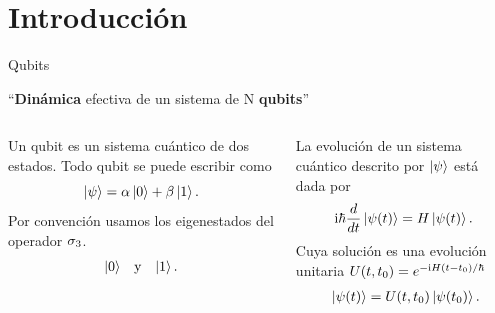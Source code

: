 \section{Introducción}


\begin{frame}{Qubits}
    \begin{center}
        ``\textbf{Dinámica} efectiva de un sistema de N \textbf{qubits}''
    \end{center}
    \pause
    \begin{columns}
        \begin{column}{0.5\textwidth}
            \begin{center}
                Un qubit es un sistema cuántico de dos estados.
                \pause
                Todo qubit se puede escribir como
                \begin{equation}
                    \ket{\psi}=\alpha\ket{0}+\beta\ket{1}.\nonumber
                \end{equation}
                \pause
                Por convención usamos los eigenestados del operador $\sigma_{3}$.
                \begin{align}
                    \ket{0} & & \text{y} & & \ket{1}. \nonumber
                \end{align} 
            \end{center}
        \end{column}
        \pause
        \begin{column}{0.5\textwidth}
            La evolución de un sistema cuántico descrito por $\ket{\psi}$ está dada por
            \begin{equation}
                \text{i}\hbar\frac{d}{dt}\ket{\psi(t)}=H\ket{\psi(t)}.\nonumber
            \end{equation}
            \pause
            Cuya solución es una evolución unitaria $U(t,t_{0})=e^{-\text{i} H(t-t_{0})/\hbar}$
            \begin{align}
                \ket{\psi(t)}=U(t,t_{0})\ket{\psi(t_{0})} \rlap{.}\nonumber
            \end{align}
        \end{column}
    \end{columns}
\end{frame}

